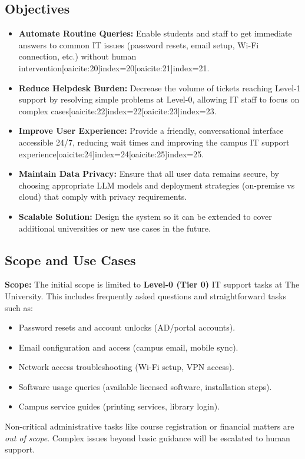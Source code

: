 \documentclass{article.cls}
\begin{document}
    \subsection{Objectives}
    \begin{itemize}
        \item \textbf{Automate Routine Queries:} Enable students and staff to get immediate answers to common IT issues (password resets, email setup, Wi-Fi connection, etc.) without human intervention[oaicite:20]{index=20}[oaicite:21]{index=21}.
        \item \textbf{Reduce Helpdesk Burden:} Decrease the volume of tickets reaching Level-1 support by resolving simple problems at Level-0, allowing IT staff to focus on complex cases[oaicite:22]{index=22}[oaicite:23]{index=23}.
        \item \textbf{Improve User Experience:} Provide a friendly, conversational interface accessible 24/7, reducing wait times and improving the campus IT support experience[oaicite:24]{index=24}[oaicite:25]{index=25}.
        \item \textbf{Maintain Data Privacy:} Ensure that all user data remains secure, by choosing appropriate LLM models and deployment strategies (on-premise vs cloud) that comply with privacy requirements.
        \item \textbf{Scalable Solution:} Design the system so it can be extended to cover additional universities or new use cases in the future.
    \end{itemize}

    \subsection{Scope and Use Cases}
    \textbf{Scope:} The initial scope is limited to \textbf{Level-0 (Tier 0)} IT support tasks at The University. This includes frequently asked questions and straightforward tasks such as:\newline
    \hfill\break
    \begin{itemize}
        \item Password resets and account unlocks (AD/portal accounts).
        \item Email configuration and access (campus email, mobile sync).
        \item Network access troubleshooting (Wi-Fi setup, VPN access).
        \item Software usage queries (available licensed software, installation steps).
        \item Campus service guides (printing services, library login).
    \end{itemize}
    \noindent Non-critical administrative tasks like course registration or financial matters are \textit{out of scope}. Complex issues beyond basic guidance will be escalated to human support.
\end{document}
